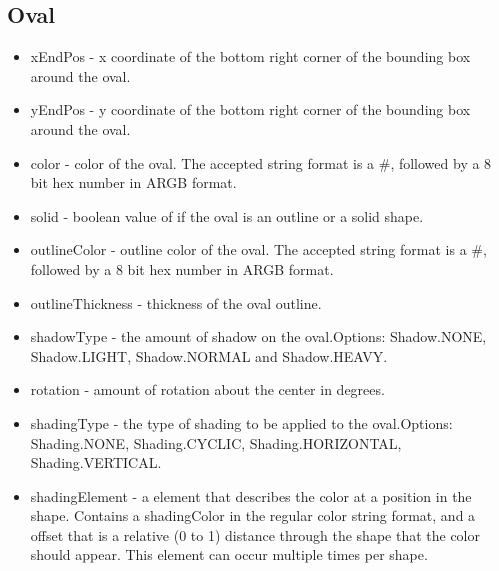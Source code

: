 \documentclass{article}
\begin{document}
\subsection{Oval}
\begin{itemize}
\item xEndPos - x coordinate of the bottom right corner of the bounding box around the oval.
\item yEndPos - y coordinate of the bottom right corner of the bounding box around the oval.
\item color - color of the oval. The accepted string format is a \#, followed by a 8 bit hex number in ARGB format.
\item solid - boolean value of if the oval is an outline or a solid shape.
\item outlineColor - outline color of the oval. The accepted string format is a \#, followed by a 8 bit hex number in ARGB format.
\item outlineThickness - thickness of the oval outline.
\item shadowType - the amount of shadow on the oval.\newline  Options: Shadow.NONE, Shadow.LIGHT, Shadow.NORMAL and Shadow.HEAVY.
\item rotation - amount of rotation about the center in degrees. 
\item shadingType - the type of shading to be applied to the oval.\newline  Options: Shading.NONE, Shading.CYCLIC, Shading.HORIZONTAL, Shading.VERTICAL.
\item shadingElement - a element that describes the color at a position in the shape. Contains a shadingColor in the regular color string format, and a offset that is a relative (0 to 1) distance through the shape that the color should appear. This element can occur multiple times per shape.
\end{itemize}
\end{document}
